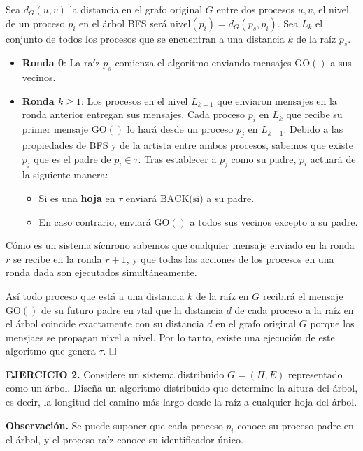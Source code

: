 \documentclass[12pt]{article}
\begin{document}
\noindent Sea $d_G(u, v)$ la distancia en el grafo original $G$ entre dos procesos $u,v$, el nivel de un proceso $p_i$ en el \'arbol BFS ser\'a $\text{nivel}(p_i) = d_G(p_s, p_i)$. Sea $L_k$ el conjunto de todos los procesos que se encuentran a una distancia $k$ de la ra\'iz $p_s$.

\begin{itemize}
    \item \textbf{Ronda 0}: La ra\'iz $p_s$ comienza el algoritmo enviando mensajes $\text{GO}() $ a sus vecinos.
    \item \textbf{Ronda $k \geq 1$}: Los procesos en el nivel $L_{k-1}$ que enviaron mensajes en la ronda anterior entregan sus mensajes. Cada proceso $p_i$ en $L_k$ que recibe su primer mensaje $\text{GO}()$ lo har\'a desde un proceso $p_j$ en $L_{k-1}$. Debido a las propiedades de BFS y de la artista entre ambos procesos, sabemos que existe $p_j$ que es el  padre de $p_i \in \tau$. Tras establecer a $p_j$ como su padre, $p_i$ actuar\'a de la siguiente manera:
    \begin{itemize}
        \item Si es una \textbf{hoja} en $\tau$ enviar\'a $\text{BACK(si)}$ a su padre.
        \item En caso contrario, enviar\'a $\text{GO}()$ a todos sus vecinos excepto a su padre.
    \end{itemize}
\end{itemize}

 \noindent Cómo es un sistema sícnrono sabemos que cualquier mensaje enviado en la ronda $r$ se recibe en la ronda $r + 1$, y que todas las acciones de los procesos en una ronda dada son ejecutados simult\'aneamente.

\noindent Así todo proceso que est\'a a una distancia $k$ de la ra\'iz en $G$ recibir\'a el mensaje $\text{GO}()$ de su futuro padre en $\tau$tal que la distancia $d$ de cada proceso a la ra\'iz en el \'arbol coincide exactamente con su distancia $d$ en el grafo original $G$ porque los mensjaes se propagan nivel a nivel. Por lo tanto, existe una ejecuci\'on de este algoritmo que genera $\tau$. $\hfill \square$

\begin{ejercicio}
\noindent \textbf{EJERCICIO 2.} 
Considere un sistema distribuido $G = (\Pi, E)$ representado como un árbol. Diseña un
algoritmo distribuido que determine la altura del árbol, es decir, la longitud del camino más
largo desde la raíz a cualquier hoja del árbol.  

\noindent \textbf{Observación.} Se puede suponer que cada proceso $p_i$ conoce su proceso padre en el árbol, y
el proceso raíz conoce su identificador único. \\
\end{ejercicio}
\end{document}
